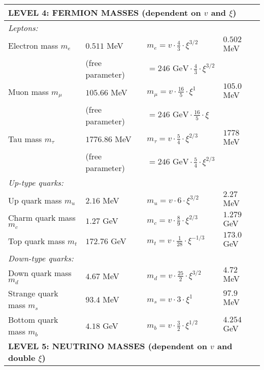 \documentclass[12pt,a4paper]{article}
\begin{document}
\begin{longtable}{p{5cm}p{4cm}p{3.5cm}p{3.5cm}}
	\midrule
	\multicolumn{4}{l}{\textbf{LEVEL 4: FERMION MASSES (dependent on $v$ and $\xi$)}} \\
	\midrule
	
	\multicolumn{4}{l}{\textit{Leptons:}} \\
	
	Electron mass $m_e$ & $0.511$ MeV & $m_e = v \cdot \frac{4}{3} \cdot \xi^{3/2}$ & $0.502$ MeV \\
	& (free parameter) & $= 246 \text{ GeV} \cdot \frac{4}{3} \cdot \xi^{3/2}$ & \\[0.3em]
	
	Muon mass $m_\mu$ & $105.66$ MeV & $m_\mu = v \cdot \frac{16}{5} \cdot \xi^1$ & $105.0$ MeV \\
	& (free parameter) & $= 246 \text{ GeV} \cdot \frac{16}{5} \cdot \xi$ & \\[0.3em]
	
	Tau mass $m_\tau$ & $1776.86$ MeV & $m_\tau = v \cdot \frac{5}{4} \cdot \xi^{2/3}$ & $1778$ MeV \\
	& (free parameter) & $= 246 \text{ GeV} \cdot \frac{5}{4} \cdot \xi^{2/3}$ & \\[0.3em]
	
	\multicolumn{4}{l}{\textit{Up-type quarks:}} \\
	
	Up quark mass $m_u$ & $2.16$ MeV & $m_u = v \cdot 6 \cdot \xi^{3/2}$ & $2.27$ MeV \\
	
	Charm quark mass $m_c$ & $1.27$ GeV & $m_c = v \cdot \frac{8}{9} \cdot \xi^{2/3}$ & $1.279$ GeV \\
	
	Top quark mass $m_t$ & $172.76$ GeV & $m_t = v \cdot \frac{1}{28} \cdot \xi^{-1/3}$ & $173.0$ GeV \\
	
	\multicolumn{4}{l}{\textit{Down-type quarks:}} \\
	
	Down quark mass $m_d$ & $4.67$ MeV & $m_d = v \cdot \frac{25}{2} \cdot \xi^{3/2}$ & $4.72$ MeV \\
	
	Strange quark mass $m_s$ & $93.4$ MeV & $m_s = v \cdot 3 \cdot \xi^1$ & $97.9$ MeV \\
	
	Bottom quark mass $m_b$ & $4.18$ GeV & $m_b = v \cdot \frac{3}{2} \cdot \xi^{1/2}$ & $4.254$ GeV \\
	
	\midrule
	\multicolumn{4}{l}{\textbf{LEVEL 5: NEUTRINO MASSES (dependent on $v$ and double $\xi$)}} \\
	\midrule
	

\end{longtable}
\end{document}
